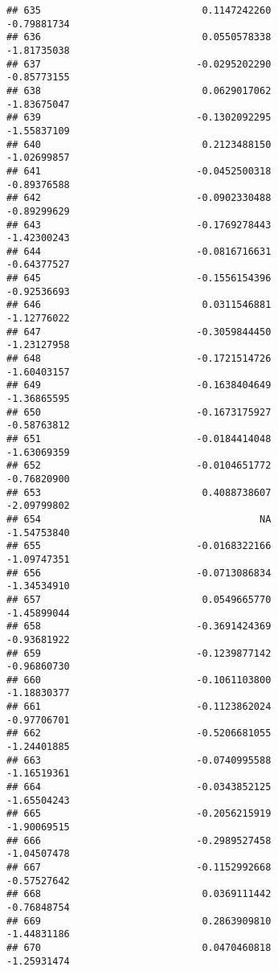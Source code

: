 \documentclass[
]{article}
\begin{document}
\begin{verbatim}
## 635                            0.1147242260                -0.79881734
## 636                            0.0550578338                -1.81735038
## 637                           -0.0295202290                -0.85773155
## 638                            0.0629017062                -1.83675047
## 639                           -0.1302092295                -1.55837109
## 640                            0.2123488150                -1.02699857
## 641                           -0.0452500318                -0.89376588
## 642                           -0.0902330488                -0.89299629
## 643                           -0.1769278443                -1.42300243
## 644                           -0.0816716631                -0.64377527
## 645                           -0.1556154396                -0.92536693
## 646                            0.0311546881                -1.12776022
## 647                           -0.3059844450                -1.23127958
## 648                           -0.1721514726                -1.60403157
## 649                           -0.1638404649                -1.36865595
## 650                           -0.1673175927                -0.58763812
## 651                           -0.0184414048                -1.63069359
## 652                           -0.0104651772                -0.76820900
## 653                            0.4088738607                -2.09799802
## 654                                      NA                -1.54753840
## 655                           -0.0168322166                -1.09747351
## 656                           -0.0713086834                -1.34534910
## 657                            0.0549665770                -1.45899044
## 658                           -0.3691424369                -0.93681922
## 659                           -0.1239877142                -0.96860730
## 660                           -0.1061103800                -1.18830377
## 661                           -0.1123862024                -0.97706701
## 662                           -0.5206681055                -1.24401885
## 663                           -0.0740995588                -1.16519361
## 664                           -0.0343852125                -1.65504243
## 665                           -0.2056215919                -1.90069515
## 666                           -0.2989527458                -1.04507478
## 667                           -0.1152992668                -0.57527642
## 668                            0.0369111442                -0.76848754
## 669                            0.2863909810                -1.44831186
## 670                            0.0470460818                -1.25931474

\end{verbatim}
\end{document}

